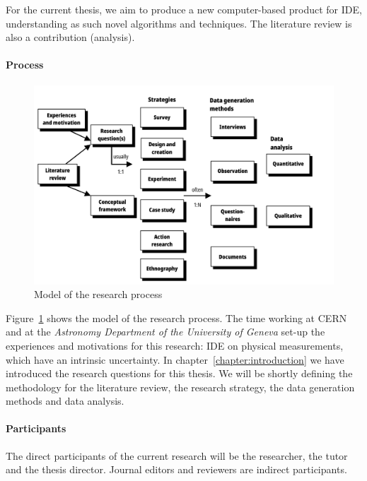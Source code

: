 For the current thesis, we aim to produce a new computer-based product
for \gls{IDE}, understanding as such novel algorithms and techniques.
The literature review is also a contribution (analysis).

\paragraph{Process}
\label{method:process}

\begin{figure}[htpb]
  \centering
  \includegraphics[width=\linewidth]{images/2_methodology/modelo_proceso}
  \caption{Model of the research process~\cite{Oates2006}}
  \label{fig:method_process_model}
\end{figure}

Figure~\ref{fig:method_process_model} shows the model of the research process.
The time working at \gls{CERN} and at the \emph{Astronomy Department of the University of Geneva}
set-up the experiences and motivations for this research: \gls{IDE} on physical measurements,
which have an intrinsic uncertainty. In chapter~\ref{chapter:introduction} we have
introduced the research questions for this thesis.
We will be shortly defining the methodology for the literature review,
the research strategy, the data generation methods and data analysis.

\paragraph{Participants}
\label{method:participants}
The direct participants of the current research will be the researcher, the tutor and
the thesis director. Journal editors and reviewers are indirect participants.


